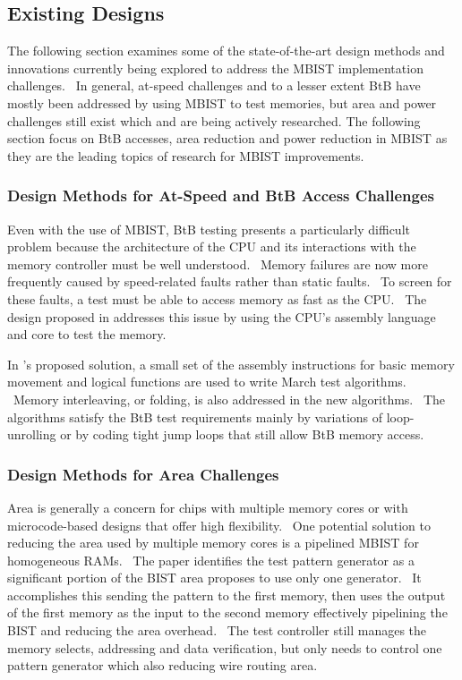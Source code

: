 \subsection{Existing Designs}
The following section examines some of the state-of-the-art design methods and innovations currently being explored to address the MBIST implementation challenges.  In general, at-speed challenges and to a lesser extent BtB have mostly been addressed by using MBIST to test memories, but area and power challenges still exist which and are being actively researched.  The following section focus on BtB accesses, area reduction and power reduction in MBIST as they are the leading topics of research for MBIST improvements.

\subsubsection{Design Methods for At-Speed and BtB Access Challenges}
Even with the use of MBIST, BtB testing presents a particularly difficult problem because the architecture of the CPU and its interactions with the memory controller must be well understood.  Memory failures are now more frequently caused by speed-related faults rather than static faults.  To screen for these faults, a test must be able to access memory as fast as the CPU.  The design proposed in \cite{5491773} addresses this issue by using the CPU’s assembly language and core to test the memory.

In \cite{5491773}’s proposed solution, a small set of the assembly instructions for basic memory movement and logical functions are used to write March test algorithms.  Memory interleaving, or folding, is also addressed in the new algorithms.  The algorithms satisfy the BtB test requirements mainly by variations of loop-unrolling or by coding tight jump loops that still allow BtB memory access.     

\subsubsection{Design Methods for Area Challenges}
Area is generally a concern for chips with multiple memory cores or with microcode-based designs that offer high flexibility.  One potential solution \cite{4711617} to reducing the area used by multiple memory cores is a pipelined MBIST for homogeneous RAMs.  The paper identifies the test pattern generator as a significant portion of the BIST area proposes to use only one generator.  It accomplishes this sending the pattern to the first memory, then uses the output of the first memory as the input to the second memory effectively pipelining the BIST and reducing the area overhead.  The test controller still manages the memory selects, addressing and data verification, but only needs to control one pattern generator which also reducing wire routing area.

